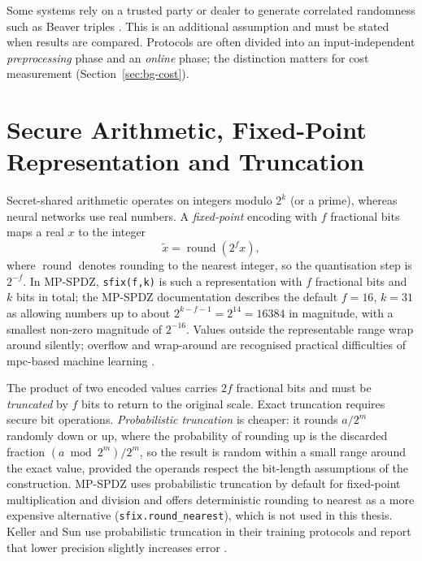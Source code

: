 Some systems rely on a trusted party or dealer to generate correlated randomness such as Beaver triples \cite{knott2021crypten,smajlovic2023sequre}. This is an additional assumption and must be stated when results are compared. Protocols are often divided into an input-independent \emph{preprocessing} phase and an \emph{online} phase; the distinction matters for cost measurement (Section~\ref{sec:bg-cost}).

\section{Secure Arithmetic, Fixed-Point Representation and Truncation}\label{sec:bg-fixed}
Secret-shared arithmetic operates on integers modulo $2^k$ (or a prime), whereas neural networks use real numbers. A \emph{fixed-point} encoding with $f$ fractional bits maps a real $x$ to the integer
\begin{equation}
  \tilde{x} = \operatorname{round}\!\left(2^{f}x\right),
  \label{eq:fixed}
\end{equation}
where $\operatorname{round}$ denotes rounding to the nearest integer, so the quantisation step is $2^{-f}$. In MP-SPDZ, \texttt{sfix(f,k)} is such a representation with $f$ fractional bits and $k$ bits in total; the MP-SPDZ documentation describes the default $f=16$, $k=31$ as allowing numbers up to about $2^{k-f-1}=2^{14}=16384$ in magnitude, with a smallest non-zero magnitude of $2^{-16}$. Values outside the representable range wrap around silently; overflow and wrap-around are recognised practical difficulties of \ac{mpc}-based machine learning \cite{knott2021crypten,zhang2025efficient}.

The product of two encoded values carries $2f$ fractional bits and must be \emph{truncated} by $f$ bits to return to the original scale. Exact truncation requires secure bit operations. \emph{Probabilistic truncation} is cheaper: it rounds $a/2^{m}$ randomly down or up, where the probability of rounding up is the discarded fraction $(a \bmod 2^{m})/2^{m}$, so the result is random within a small range around the exact value, provided the operands respect the bit-length assumptions of the construction. MP-SPDZ uses probabilistic truncation by default for fixed-point multiplication and division and offers deterministic rounding to nearest as a more expensive alternative (\texttt{sfix.round\_nearest}), which is not used in this thesis. Keller and Sun use probabilistic truncation in their training protocols and report that lower precision slightly increases error \cite{keller2022sqt}.

